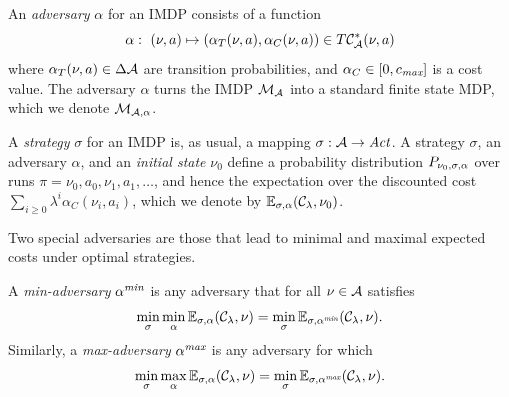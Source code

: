 \documentclass{llncs}
\newcommand{\todo}[1]{\textcolor{blue} {\bf TODO:} \parbox[t]{0.8\textwidth}{#1}}
\begin{document}
\begin{definition}
\label{def:adversary}  
An \emph{adversary} $\alpha$ for an IMDP consists of a function
\begin{equation}
    \alpha:\ (\nu,a) \mapsto (\alpha_T(\nu,a),\alpha_C(\nu,a))\in T\cost^*_{\partition}(\nu,a) 
\end{equation}
where $\alpha_T(\nu,a)\in\Delta\mathcal{A}$ are transition probabilities, and
$\alpha_C\in[0,c_{\emph{max}}]$ is a cost value. The adversary $\alpha$ turns the IMDP $\mathcal{M}_{\mathcal{A}}$ into a
standard finite state MDP, which we denote $\mathcal{M}_{\mathcal{A},\alpha}$. 

A \emph{strategy} $\sigma$ for an IMDP is, as usual, a mapping $\sigma: \mathcal{A}\rightarrow\mathit{Act}$.
A strategy $\sigma$, an adversary $\alpha$, and   an \emph{initial state} $\nu_0$ 
define a probability distribution
  $P_{\nu_0,\sigma,\alpha}$ over runs $\pi=\nu_0,a_0,\nu_1,a_1,\ldots$, and hence the expectation
  over the discounted cost $\sum_{i\geq 0} \lambda^i \alpha_C(\nu_i,a_i)$, which we denote by
  $\mathbb{E}_{\sigma,\alpha}(\mathcal{C}_\lambda,\nu_0)$.
\end{definition}



Two special adversaries are those that lead to minimal and maximal expected costs under optimal strategies.

\begin{definition}
A \emph{min-adversary} $\alpha^{\emph{min}}$ is any adversary that for all $\nu\in\mathcal{A}$ satisfies
\begin{equation}
\label{eq:alphamin}
\min_{\sigma}\min_{\alpha}\mathbb{E}_{\sigma,\alpha}(\mathcal{C}_\lambda,\nu) = \min_{\sigma}\mathbb{E}_{\sigma,\alpha^{\emph{min}}}(\mathcal{C}_\lambda,\nu).
\end{equation}
Similarly, a \emph{max-adversary} $\alpha^{\emph{max}}$ is any adversary for which
\begin{equation}
\label{eq:alphamax}
\min_{\sigma}\max_{\alpha}\mathbb{E}_{\sigma,\alpha}(\mathcal{C}_\lambda,\nu) = \min_{\sigma}\mathbb{E}_{\sigma,\alpha^{\emph{max}}}(\mathcal{C}_\lambda,\nu).
\end{equation}
\end{definition}
\end{document}
